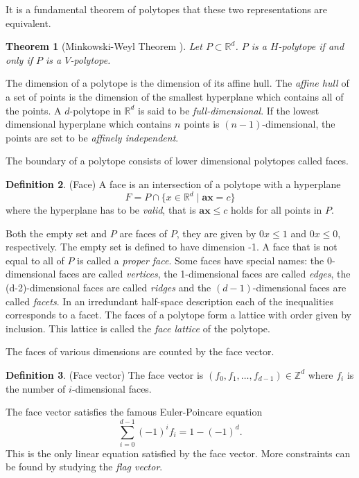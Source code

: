 \documentclass[a4paper,12pt]{book}
\theoremstyle{plain}
\newtheorem{theorem}{Theorem}[section]
\theoremstyle{definition}
\newtheorem{definition}[theorem]{Definition}
\begin{document}
It is a fundamental theorem of polytopes that these two representations are 
equivalent.
\begin{theorem}[Minkowski-Weyl Theorem {\cite[Thm. 1.1.]{PolyLec}}] Let $P \subset \mathbb{R}^d$. 
$P$ is a $H$-polytope if and only if $P$ is a $V$-polytope.
\end{theorem}
The dimension of a polytope is the dimension of its affine hull. The \textit{affine 
hull} of a set of points is the dimension of the smallest hyperplane which 
contains all of the points. A $d$-polytope in $\mathbb{R}^d$ is said to be 
\textit{full-dimensional}. If the lowest dimensional hyperplane which contains 
$n$ points is $(n-1)$-dimensional, the points are set to be \textit{affinely 
independent}.

 The boundary 
of a polytope consists of lower dimensional polytopes called faces. 
\begin{definition}
 (Face) A face is an intersection of a polytope with a hyperplane 
\begin{equation}
 F = P \cap \{x \in \mathbb{R}^d \mid \mathbf{a}\mathbf{x} = c\}
\end{equation}
where the hyperplane has to be \textit{valid}, that is $\mathbf{a}\mathbf{x} 
\leq c$ holds for all points in $P$. 

\end{definition}
Both the empty set and $P$ are faces of $P$, they are given by $0x \le 1$ and $0x \le 0$, respectively.
The empty set is defined to have dimension -1.
A face that is not equal to all of $P$ is called a \textit{proper face}.
Some faces have special names: the 0-dimensional faces are called 
\textit{vertices}, the 1-dimensional faces are called \textit{edges}, the (d-2)-dimensional
faces are called \textit{ridges} and the 
$(d-1)$-dimensional faces are called \textit{facets}. In an irredundant 
half-space description each of the inequalities corresponds to a facet.
 The faces of a polytope 
form a lattice with order given by inclusion. This lattice is called the 
\textit{face lattice} of the polytope.

The faces of various dimensions 
are counted by the face vector.
\begin{definition}
 (Face vector) The face vector is $(f_0, f_1, \dots, f_{d-1}) \in \mathbb{Z}^d$ 
where $f_i$ is 
the number of $i$-dimensional faces.
\end{definition}
The face vector satisfies the famous Euler-Poincare equation
\begin{equation}
 \sum_{i=0}^{d-1} (-1)^i f_i = 1 - (-1)^d.
\end{equation}
This is the only linear equation satisfied by the face vector. More 
constraints can be found by studying the \textit{flag vector}.
\end{document}
